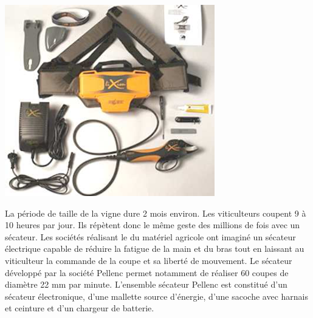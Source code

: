 \documentclass[10pt,oneside]{article}
\begin{document}
\begin{minipage}[c]{.25\linewidth}
\begin{center}
 \includegraphics[width=.85\textwidth]{png/secateur1}
\end{center}
\end{minipage} \hfill
\begin{minipage}[c]{.7\linewidth}

La période de taille de la vigne dure 2 mois environ. Les viticulteurs coupent 9 à 10 heures par jour. Ils répètent donc le même geste des millions de fois avec un sécateur. Les sociétés réalisant le du matériel agricole ont imaginé un sécateur électrique capable de réduire la fatigue de la main et du bras tout en laissant au viticulteur la commande de la coupe et sa liberté de mouvement. Le sécateur développé par la société Pellenc permet notamment de réaliser 60 coupes de diamètre 22 mm par minute. L’ensemble sécateur Pellenc est constitué d’un sécateur électronique, d’une mallette source d’énergie, d’une sacoche avec harnais et ceinture et d’un chargeur de batterie.

\end{minipage}
\end{document}
